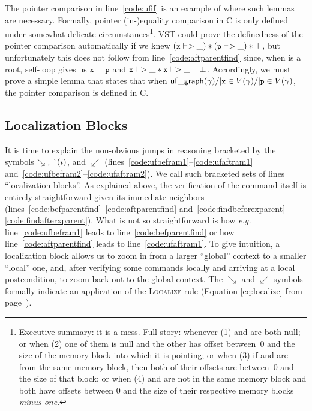 The pointer comparison in line~\ref{code:ufif} is an example of where
such lemmas are necessary.
Formally, pointer (in-)equality comparison in C is only defined under somewhat delicate
circumstances\footnote{\label{footnote:pointereq}Executive summary: it is a mess. Full story:
whenever (1)  and  are both null; or when (2) one of them is null and the
other has offset between~0 and the size of the memory block into which it is pointing;
or when (3) if  and  are from the same memory block, then both of their
offsets are between~0 and the size of that block; or when (4)  and  are
not in the same memory block and both have offsets between 0 and the size of their
respective memory blocks \emph{minus one}.}.  VST could prove the definedness of the
pointer comparison automatically if we knew
\mbox{$(\li{x} |-> \_) * (\li{p} |-> \_) * \top$}, but
unfortunately this does not follow from line~\ref{code:aftparentfind} since,
when  is a root, self-loop gives us $\li{x}=\li{p}$ and
$\li{x} |-> \_ * \li{x} |-> \_ |- \bot$.  Accordingly, we must prove a
simple lemma that states that when $\p{uf\_graph}(\gamma) /| \li{x}
\in V(\gamma) /| \li{p} \in V(\gamma)$,
the pointer comparison is defined in C.

\subsection{Localization Blocks}
\label{sec:localblocks}

It is time to explain the non-obvious jumps in reasoning bracketed by the
symbols $\searrow \text{, } \lightning(i)$, and $\swarrow$
(lines~\ref{code:ufbefram1}--\ref{code:ufaftram1} and~\ref{code:ufbefram2}--\ref{code:ufaftram2}). We call such bracketed sets of lines ``localization blocks''.
As explained above, the verification of the command itself is entirely
straightforward given its immediate neighbors
(lines~\ref{code:befparentfind}--\ref{code:aftparentfind}
and~\ref{code:findbeforexparent}--\ref{code:findafterxparent}).
What is not so straightforward is how \emph{e.g.} line~\ref{code:ufbefram1}
leads to line~\ref{code:befparentfind} or how line~\ref{code:aftparentfind}
leads to line~\ref{code:ufaftram1}.
To give intuition, a localization block allows us to zoom in from a larger
``global'' context to a smaller ``local'' one, and, after verifying some commands
locally and arriving at a local postcondition, to zoom back out to the global
context. The $\searrow$ and $\swarrow$ symbols formally indicate an application
of the \textsc{Localize} rule (Equation \ref{eq:localize} from page~\pageref{eq:localize}).


